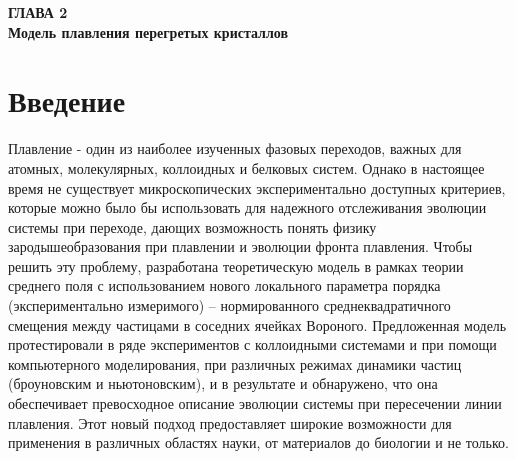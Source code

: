
\newpage
\begin{center}
\textbf{\large ГЛАВА 2 \\ Модель плавления перегретых кристаллов}
\end{center}


\section{Введение}

Плавление - один из наиболее изученных фазовых переходов, важных для атомных, молекулярных, коллоидных и белковых систем.
Однако в настоящее время не существует микроскопических экспериментально доступных критериев, которые можно было бы использовать для надежного отслеживания эволюции системы при переходе, дающих возможность  понять физику зародышеобразования при плавлении и эволюции фронта плавления.
Чтобы решить эту проблему, разработана теоретическую модель в рамках теории среднего поля с использованием нового локального параметра порядка (экспериментально измеримого) -- нормированного среднеквадратичного смещения между частицами в соседних ячейках Вороного.
Предложенная модель протестировали в ряде экспериментов с коллоидными системами и при помощи компьютерного моделирования, при различных режимах динамики частиц (броуновским и ньютоновским), и в результате и обнаружено, что она обеспечивает превосходное описание эволюции системы при пересечении линии плавления.
Этот новый подход предоставляет широкие возможности для применения в различных областях науки, от материалов до биологии и не только.

